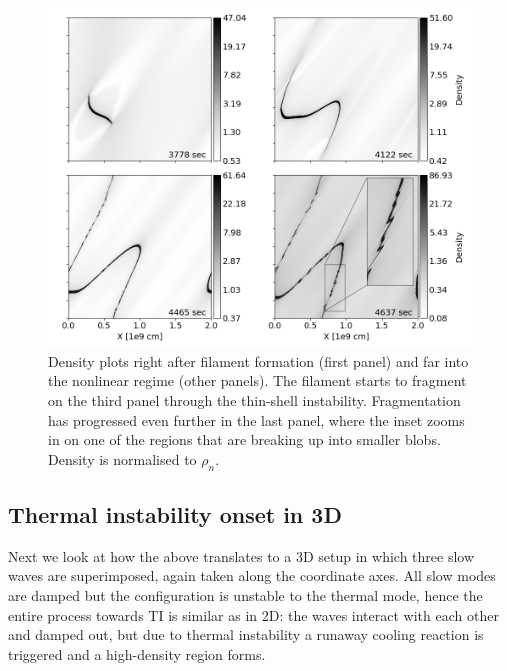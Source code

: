\begin{figure}[t]
  \centering
  \includegraphics[width=\textwidth]{2d_density_fragmentation.png}
  \caption{
    Density plots right after filament formation (first panel) and far into the nonlinear regime (other panels). The filament starts to fragment on the third panel through the thin-shell instability. Fragmentation has progressed even further in the last panel, where the inset zooms in on one of the regions that are breaking up into smaller blobs. Density is normalised to $\rho_n$.
  }
  \label{fig: 2d_density_fragmentation}
\end{figure}


\subsection{Thermal instability onset in 3D}
Next we look at how the above translates to a 3D setup in which three slow waves are superimposed, again taken along the coordinate axes. All slow modes are damped but the configuration is unstable to the thermal mode, hence the entire process towards TI is similar as in 2D: the waves interact with each other and damped out, but due to thermal instability a runaway cooling reaction is triggered and a high-density region forms.

